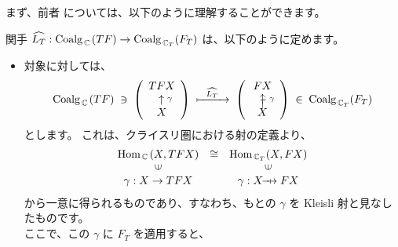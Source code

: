 \documentclass[
		head_space=20mm,
		foot_space=20mm,
		gutter=10mm,
		line_length=190mm
]{jlreq}
\begin{document}
\noindent まず、前者  については、以下のように理解することができます。
\vspace{8pt}

\noindent 
関手 $\widehat{L_T}:\mathrm{Coalg}_{\,\mathbb{C}\,}(TF)\to\mathrm{Coalg}_{\,\mathbb{C}_T}(F_T)$ は、以下のように定めます。
\begin{itemize}
	\item 対象に対しては、
	\[ \Coalg_{\,\C\,}(TF)\;\ni\;\left(\begin{array}{c}TFX\\~~\uparrow\substack{\gamma}\\X\end{array}\right)\;\xmapsto{~~\widehat{L_T}~~}\;\left(\begin{array}{c}FX\\~~\rotatebox{90}{$\!\computationrightarrow$}\;\substack{\gamma}\\X\end{array}\right)\;\in\;\Coalg_{\,\C_T}(F_T)\] とします。
	これは、クライスリ圏における射の定義より、 %
	\[\begin{array}{ccc}\Hom_{\,\C\,}(X,TFX)&\cong&\Hom_{\,\C_T}(X,FX)\\\rotatebox{90}{$\in$}&&\rotatebox{90}{$\in$}\\\gamma:X\to TFX&&\gamma:X\computationrightarrow FX\end{array}\]
	から一意に得られるものであり、すなわち、もとの $\gamma$ を Kleisli 射と見なしたものです。\\ 
	ここで、この $\gamma$ に $F_T$ を適用すると、

\end{itemize}
\end{document}
